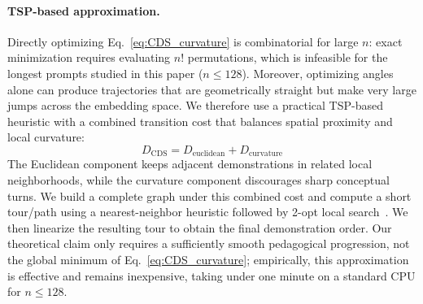 \paragraph{TSP-based approximation.}
Directly optimizing Eq.~\eqref{eq:CDS_curvature} is combinatorial for large $n$: exact minimization requires evaluating $n!$ permutations, which is infeasible for the longest prompts studied in this paper ($n\le128$).
Moreover, optimizing angles alone can produce trajectories that are geometrically straight but make very large jumps across the embedding space.
We therefore use a practical TSP-based heuristic with a combined transition cost that balances spatial proximity and local curvature:
\vspace{-0.5mm}
\begin{equation*}
D_{\mathrm{CDS}} = D_{\mathrm{euclidean}} + D_{\mathrm{curvature}}
\end{equation*}
\vspace{-0.5mm}
The Euclidean component keeps adjacent demonstrations in related local neighborhoods, while the curvature component discourages sharp conceptual turns.
We build a complete graph under this combined cost and compute a short tour/path using a nearest-neighbor heuristic followed by 2-opt local search~\cite{tsp}.
We then linearize the resulting tour to obtain the final demonstration order.
Our theoretical claim only requires a sufficiently smooth pedagogical progression, not the global minimum of Eq.~\eqref{eq:CDS_curvature}; empirically, this approximation is effective and remains inexpensive, taking under one minute on a standard CPU for $n\le128$.

